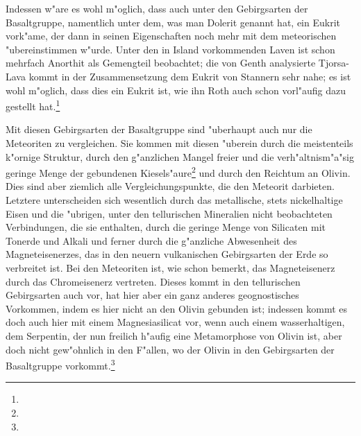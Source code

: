 \documentclass[a4paper, 11pt, oneside]{article}
\begin{document}
Indessen w"are es wohl m"oglich, dass auch unter den Gebirgsarten der Basaltgruppe, namentlich unter dem, was man Dolerit genannt hat, ein Eukrit vork"ame, der dann in seinen Eigenschaften noch mehr mit dem meteorischen "ubereinstimmen w"urde. Unter den in Island vorkommenden Laven ist schon mehrfach Anorthit als Gemengteil beobachtet; die von Genth analysierte Tjorsa-Lava kommt in der Zusammensetzung dem Eukrit von Stannern sehr nahe; es ist wohl m"oglich, dass dies ein Eukrit ist, wie ihn Roth auch schon vorl"aufig dazu gestellt hat.\footnote{}

Mit diesen Gebirgsarten der Basaltgruppe sind "uberhaupt auch nur die Meteoriten zu vergleichen. Sie kommen mit diesen "uberein durch die meistenteils k"ornige Struktur, durch den g"anzlichen Mangel freier und die verh"altnism"a"sig geringe Menge der gebundenen Kiesels"aure\footnote{} und durch den Reichtum an Olivin. Dies sind aber ziemlich alle Vergleichungspunkte, die den Meteorit darbieten. Letztere unterscheiden sich wesentlich durch das metallische, stets nickelhaltige Eisen und die "ubrigen, unter den tellurischen Mineralien nicht beobachteten Verbindungen, die sie enthalten, durch die geringe Menge von Silicaten mit Tonerde und Alkali und ferner durch die g"anzliche Abwesenheit des Magneteisenerzes, das in den neuern vulkanischen Gebirgsarten der Erde so verbreitet ist. Bei den Meteoriten ist, wie schon bemerkt, das Magneteisenerz durch das Chromeisenerz vertreten. Dieses kommt in den tellurischen Gebirgsarten auch vor, hat hier aber ein ganz anderes geognostisches Vorkommen, indem es hier nicht an den Olivin gebunden ist; indessen kommt es doch auch hier mit einem Magnesiasilicat vor, wenn auch einem wasserhaltigen, dem Serpentin, der nun freilich h"aufig eine Metamorphose von Olivin ist, aber doch nicht gew"ohnlich in den F"allen, wo der Olivin in den Gebirgsarten der Basaltgruppe vorkommt.\footnote{}
\end{document}

